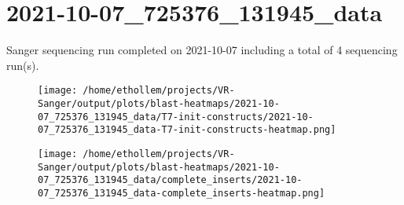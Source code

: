 \section{2021-10-07\_725376\_131945\_data}

    Sanger sequencing run completed on 2021-10-07
    including a total of 4 sequencing
    run(s).
    

    \begin{figure}[!h]
        \texttt{[image: /home/ethollem/projects/VR-Sanger/output/plots/blast-heatmaps/2021-10-07\_725376\_131945\_data/T7-init-constructs/2021-10-07\_725376\_131945\_data-T7-init-constructs-heatmap.png]}
        \centering
    \end{figure}


    \begin{figure}[!h]
        \texttt{[image: /home/ethollem/projects/VR-Sanger/output/plots/blast-heatmaps/2021-10-07\_725376\_131945\_data/complete\_inserts/2021-10-07\_725376\_131945\_data-complete\_inserts-heatmap.png]}
        \centering
    \end{figure}

\pagebreak